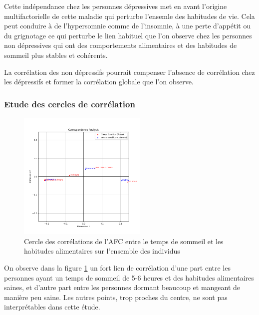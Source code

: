Cette indépendance chez les personnes dépressives met en avant l'origine multifactorielle de cette maladie qui perturbe l'ensemle des habitudes de vie. Cela peut conduire à de l'hypersomnie comme de l'insomnie, à une perte d'appétit ou du grignotage ce qui perturbe le lien habituel que l'on observe chez les personnes non dépressives qui ont des comportements alimentaires et des habitudes de sommeil plus stables et cohérents. 

La corrélation des non dépressifs pourrait compenser l'absence de corrélation chez les dépressifs et former la corrélation globale que l'on observe. 

\subsubsection{Etude des cercles de corrélation}

\begin{figure}[!h]
  \begin{center}
    \includegraphics[width=0.55\textwidth]{Images/Sleep_Dietary_all/Corr_circle.png}
  \end{center}
  \caption{Cercle des corrélations de l'AFC entre le temps de sommeil et les habitudes alimentaires sur l'ensemble des individus}\label{fig:corrSleepDietaryAll}
\end{figure}

On observe dans la figure \ref{fig:corrSleepDietaryAll} un fort lien de corrélation d'une part entre les personnes ayant un temps de sommeil de 5-6 heures et des habitudes alimentaires saines, et d'autre part entre les personnes dormant beaucoup et mangeant de manière peu saine. Les autres points, trop proches du centre, ne sont pas interprétables dans cette étude. 

